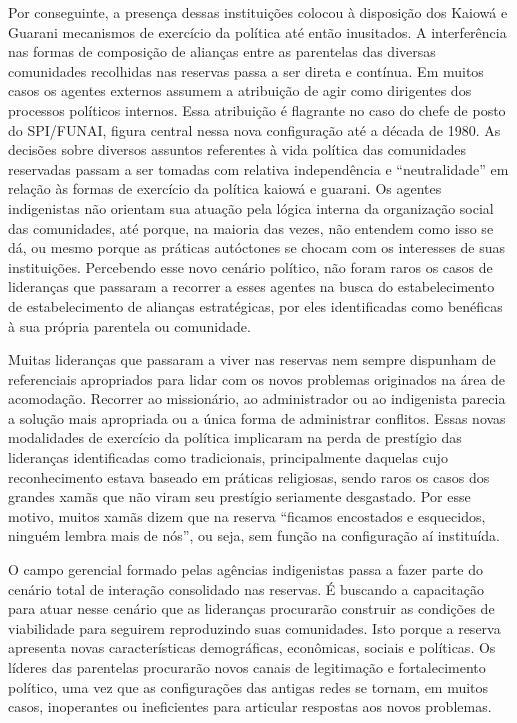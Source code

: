 Por conseguinte, a presença dessas instituições colocou à disposição dos
Kaiowá e Guarani mecanismos de exercício da política até então
inusitados. A interferência nas formas de composição de alianças entre
as parentelas das diversas comunidades recolhidas nas reservas passa a
ser direta e contínua. Em muitos casos os agentes externos assumem a
atribuição de agir como dirigentes dos processos políticos internos.
Essa atribuição é flagrante no caso do chefe de posto do SPI/FUNAI,
figura central nessa nova configuração até a década de 1980. As
decisões sobre diversos assuntos referentes à vida política das
comunidades reservadas passam a ser tomadas com relativa independência
e ``neutralidade'' em relação às formas de exercício da política kaiowá e
guarani. Os agentes indigenistas não orientam sua atuação pela lógica
interna da organização social das comunidades, até porque, na maioria
das vezes, não entendem como isso se dá, ou mesmo porque as práticas
autóctones se chocam com os interesses de suas instituições. Percebendo
esse novo cenário político, não foram raros os casos de lideranças que
passaram a recorrer a esses agentes na busca do estabelecimento de estabelecimento de alianças
estratégicas, por eles identificadas como benéficas à sua própria
parentela ou comunidade.

Muitas lideranças que passaram a viver nas reservas nem sempre dispunham
de referenciais apropriados para lidar com os novos problemas
originados na área de acomodação. Recorrer ao missionário, ao
administrador ou ao indigenista parecia a solução mais apropriada ou a
única forma de administrar conflitos. Essas novas modalidades de
exercício da política implicaram na perda de prestígio das lideranças
identificadas como tradicionais, principalmente daquelas cujo
reconhecimento estava baseado em práticas religiosas, sendo raros os
casos dos grandes xamãs que não viram seu prestígio seriamente
desgastado. Por esse motivo, muitos xamãs dizem que na reserva ``ficamos
encostados e esquecidos, ninguém lembra mais de nós'', ou seja, sem
função na configuração aí instituída.

O campo gerencial formado pelas agências indigenistas passa a fazer
parte do cenário total de interação consolidado nas reservas. É
buscando a capacitação para atuar nesse cenário que as lideranças
procurarão construir as condições de viabilidade para seguirem
reproduzindo suas comunidades. Isto porque a reserva apresenta novas
características demográficas, econômicas, sociais e políticas. Os
líderes das parentelas procurarão novos canais de legitimação e
fortalecimento político, uma vez que as configurações das antigas redes
se tornam, em muitos casos, inoperantes ou ineficientes para articular
respostas aos novos problemas. 

